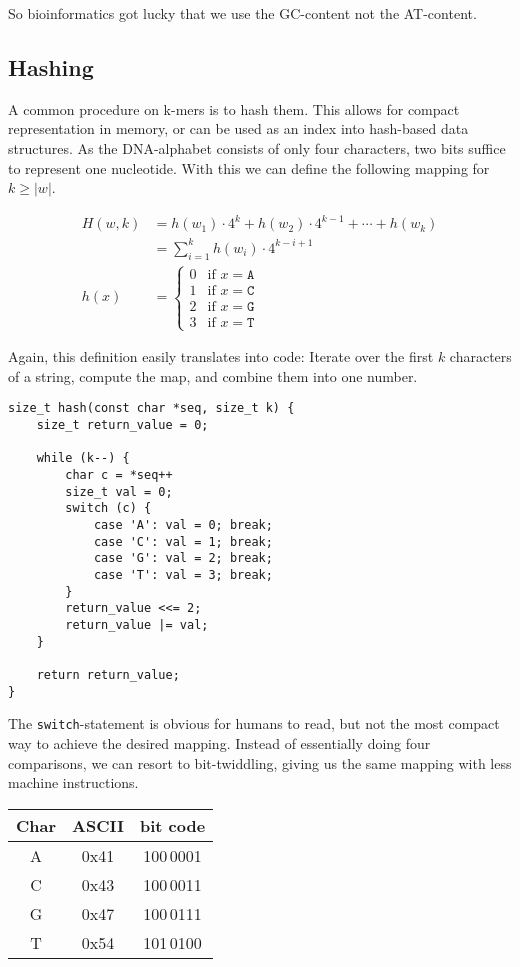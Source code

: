 \documentclass[10pt,letterpaper]{article}
\begin{document}
So bioinformatics got lucky that we use the GC-content not the AT-content.


\subsection{Hashing}
\label{sec:hash}

A common procedure on k-mers is to hash them. This allows for compact representation in memory, or can be used as an index into hash-based data structures. As the DNA-alphabet consists of only four characters, two bits suffice to represent one nucleotide. With this we can define the following mapping for $k \ge |w|$.

\begin{align*}
	H(w, k) &= h(w_1) \cdot 4^{k} + h(w_2) \cdot 4^{k-1} + \cdots + h(w_k) \\
	&= \sum_{i=1}^k h(w_i)\cdot 4^{k-i+1} \\
	h(x) &=
		\begin{cases}
			0 & \text{if } x = \texttt{A} \\
			1 & \text{if } x = \texttt{C} \\
			2 & \text{if } x = \texttt{G} \\
			3 & \text{if } x = \texttt{T}
		\end{cases}
\end{align*}

Again, this definition easily translates into code: Iterate over the first $k$ characters of a string, compute the map, and combine them into one number.

\begin{lstlisting}
size_t hash(const char *seq, size_t k) {  
    size_t return_value = 0;

    while (k--) {
    	char c = *seq++
    	size_t val = 0;
    	switch (c) {
    		case 'A': val = 0; break;
    		case 'C': val = 1; break;
    		case 'G': val = 2; break;
    		case 'T': val = 3; break;
    	}
    	return_value <<= 2;
    	return_value |= val;
    }

    return return_value;
}
\end{lstlisting}

The \lstinline!switch!-statement is obvious for humans to read, but not the most compact way to achieve the desired mapping. Instead of essentially doing four comparisons, we can resort to bit-twiddling, giving us the same mapping with less machine instructions.

\begin{tabular}{ccc}
	\toprule
	Char & ASCII & bit code \\
	\hline
	A & 0x41 & 100\,0001 \\
	C & 0x43 & 100\,0011 \\
	G & 0x47 & 100\,0111 \\
	T & 0x54 & 101\,0100 \\
	\bottomrule
\end{tabular}
\end{document}
